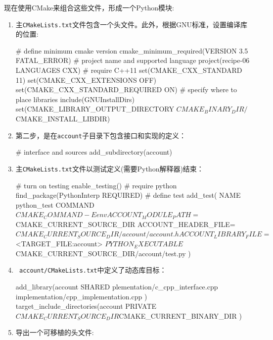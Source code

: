 
现在使用CMake来组合这些文件，形成一个Python模块:

\begin{enumerate}
\item 主\texttt{CMakeLists.txt}文件包含一个头文件。此外，根据GNU标准，设置编译库的位置:

\begin{codebox}[cmake]
# define minimum cmake version
cmake_minimum_required(VERSION 3.5 FATAL_ERROR)
# project name and supported language
project(recipe-06 LANGUAGES CXX)
# require C++11
set(CMAKE_CXX_STANDARD 11)
set(CMAKE_CXX_EXTENSIONS OFF)
set(CMAKE_CXX_STANDARD_REQUIRED ON)
# specify where to place libraries
include(GNUInstallDirs)
set(CMAKE_LIBRARY_OUTPUT_DIRECTORY
${CMAKE_BINARY_DIR}/${CMAKE_INSTALL_LIBDIR})
\end{codebox}

\item 第二步，是在\texttt{account}子目录下包含接口和实现的定义：

\begin{codebox}[cmake]
# interface and sources
add_subdirectory(account)
\end{codebox}

\item 主\texttt{CMakeLists.txt}文件以测试定义(需要Python解释器)结束：

\begin{codebox}[cmake]
# turn on testing
enable_testing()
# require python
find_package(PythonInterp REQUIRED)
# define test
add_test(
  NAME
    python_test
  COMMAND
    ${CMAKE_COMMAND} -E env ACCOUNT_MODULE_PATH=${CMAKE_CURRENT_SOURCE_DIR}
                        ACCOUNT_HEADER_FILE=${CMAKE_CURRENT_SOURCE_DIR}/account/account.h
                        ACCOUNT_LIBRARY_FILE=$<TARGET_FILE:account>
   ${PYTHON_EXECUTABLE} ${CMAKE_CURRENT_SOURCE_DIR}/account/test.py
)
\end{codebox}

\item \texttt{ account/CMakeLists.txt}中定义了动态库目标：

\begin{codebox}[cmake]
add_library(account
  SHARED
    plementation/c_cpp_interface.cpp
    implementation/cpp_implementation.cpp
  )
target_include_directories(account
  PRIVATE
    ${CMAKE_CURRENT_SOURCE_DIR}
    ${CMAKE_CURRENT_BINARY_DIR}
  )
\end{codebox}

\item 导出一个可移植的头文件:


\end{enumerate}
